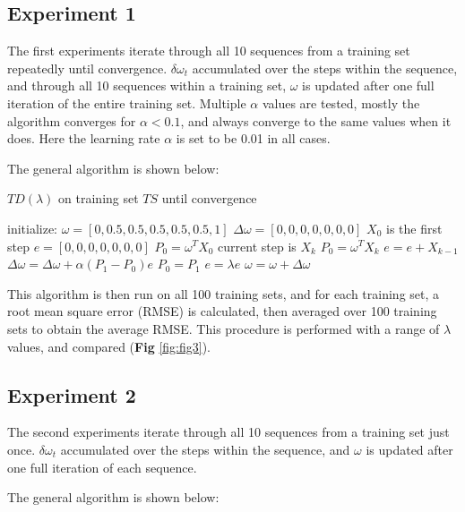 \documentclass[10pt]{article}
\begin{document}


\subsection{Experiment 1} \label{experiment1}
The first experiments iterate through all 10 sequences from a training set repeatedly until convergence. $\delta \omega_t$ accumulated over the steps within the sequence, and through all 10 sequences within a training set, $\omega$ is updated after one full iteration of the entire training set. Multiple $\alpha$ values are tested, mostly the algorithm converges for $\alpha<0.1$, and always converge to the same values when it does. Here the learning rate $\alpha$ is set to be 0.01 in all cases.\par
\noindent
The general algorithm is shown below:\par

\begin{algorithm}
\caption{$TD(\lambda)$ on training set $TS$ until convergence}
\begin{algorithmic}
\STATE initialize: $\omega=[0,0.5,0.5,0.5,0.5,0.5,1]$
\REPEAT
\STATE $\Delta\omega=[0,0,0,0,0,0,0]$
\STATE $X_0$ is the first step
\STATE $e=[0,0,0,0,0,0,0]$
\STATE $P_0=\omega^T X_0$
\STATE current step is $X_k$
\STATE $P_0=\omega^T X_k$
\STATE $e=e+X_{k-1}$
\STATE $\Delta\omega=\Delta\omega+\alpha (P_1-P_0)e$
\STATE $P_0=P_1$
\STATE $e=\lambda e$
\ENDFOR
\ENDFOR
\STATE $\omega=\omega+\Delta\omega$
\UNTIL{$\Delta\omega<\epsilon$}
\end{algorithmic}
\end{algorithm}

This algorithm is then run on all 100 training sets, and for each training set, a root mean square error (RMSE) is calculated, then averaged over 100 training sets to obtain the average RMSE. This procedure is performed with a range of $\lambda$ values, and compared (\textbf{Fig} \ref{fig:fig3}).





\subsection{Experiment 2} \label{experiment2}
The second experiments iterate through all 10 sequences from a training set just once. $\delta \omega_t$ accumulated over the steps within the sequence, and $\omega$ is updated after one full iteration of each sequence.\par
\noindent
The general algorithm is shown below:\par
\end{document}
